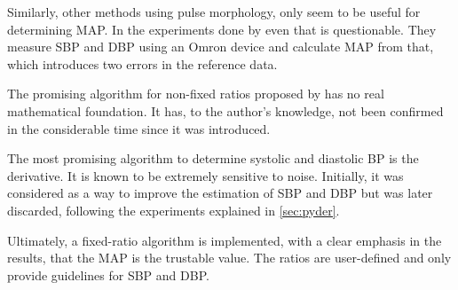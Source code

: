 Similarly, other methods using pulse morphology, only seem to be useful for determining MAP. In the experiments done by \citet{Mafi2011, Mafi2012} even that is questionable. They measure SBP and DBP using an Omron device and calculate MAP from that, which introduces two errors in the reference data.

The promising algorithm for non-fixed ratios proposed by \citet{Sapinski1996} has no real mathematical foundation. It has, to the author's knowledge, not been confirmed in the considerable time since it was introduced. 

The most promising algorithm to determine systolic and diastolic BP is the derivative. It is known to be extremely sensitive to noise.  Initially, it was considered as a way to improve the estimation of SBP and DBP but was later discarded, following the experiments explained in \ref{sec:pyder}.

Ultimately, a fixed-ratio algorithm is implemented, with a clear emphasis in the results, that the MAP is the trustable value. The ratios are user-defined and only provide guidelines for SBP and DBP.